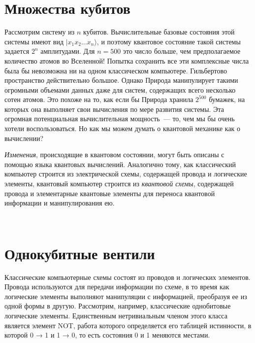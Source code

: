 \begin{multicols}{2}
    \section*{Множества кубитов}
    \normalsize{
    Рассмотрим систему из $n$ кубитов. Вычислительные базовые состояния этой системы имеют вид \(\vert x_1x_2\ldots x_n\rangle\), и поэтому квантовое состояние такой системы задается $2^n$ амплитудами.
    Для $n = 500$ это число больше, чем предполагаемое количество атомов во Вселенной! Попытка сохранить все эти комплексные числа была бы невозможна
    ни на одном классическом компьютере. Гильбертово пространство действительно большое.
    Однако Природа манипулирует такими огромными объемами данных даже для
    систем, содержащих всего несколько сотен атомов. Это похоже на то, как если бы Природа хранила $2^{500}$
    бумажек, на которых она выполняет свои вычисления по мере развития системы.
    Эта огромная потенциальная вычислительная мощность~--- то, чем мы бы очень
    хотели воспользоваться. Но как мы можем думать о квантовой механике как о вычислении?
    
    \emph{Изменения}, происходящие в квантовом состоянии, могут быть описаны с помощью языка квантовых
    вычислений. Аналогично тому, как классический компьютер строится из электрической схемы, содержащей провода и логические элементы, квантовый компьютер строится из \emph{квантовой схемы}, содержащей провода и элементарные квантовые элементы для переноса
    квантовой информации и манипулирования ею.
    }\\
    \section*{Однокубитные вентили}
    \normalsize{
        Классические компьютерные схемы состоят из проводов и логических элементов. Провода используются для передачи
        информации по схеме, в то время как логические элементы выполняют манипуляции с информацией, преобразуя ее из одной формы в другую. Рассмотрим, например, классические однобитовые
        логические элементы. Единственным нетривиальным членом этого класса является элемент NOT, работа
        которого определяется его таблицей истинности, в которой 0 → 1 и 1 → 0, то есть состояния 0 и 1
        меняются местами.

}
\end{multicols}
